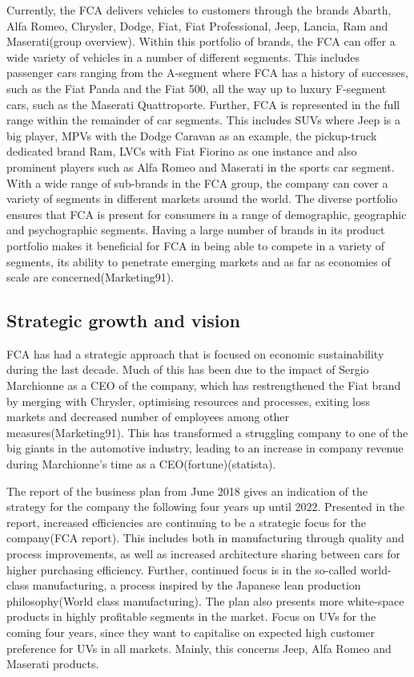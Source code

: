 Currently, the FCA delivers vehicles to customers through the brands Abarth, Alfa Romeo, Chrysler, Dodge, Fiat, Fiat Professional, Jeep, Lancia, Ram and Maserati(group overview). Within this portfolio of brands, the FCA can offer a wide variety of vehicles in a number of different segments. This includes passenger cars ranging from the A-segment where FCA has a history of successes, such as the Fiat Panda and the Fiat 500, all the way up to luxury F-segment cars, such as the Maserati Quattroporte. 
Further, FCA is represented in the full range within the remainder of car segments. This includes SUVs where Jeep is a big player, MPVs with the Dodge Caravan as an example, the pickup-truck dedicated brand Ram, LVCs with Fiat Fiorino as one instance and also prominent players such as Alfa Romeo and Maserati in the sports car segment. With a wide range of sub-brands in the FCA group, the company can cover a variety of segments in different markets around the world. The diverse portfolio ensures that FCA is present for consumers in a range of demographic, geographic and psychographic segments. Having a large number of brands in its product portfolio makes it beneficial for FCA in being able to compete in a variety of segments, its ability to penetrate emerging markets and as far as economies of scale are concerned(Marketing91).


\subsection{Strategic growth and vision}
FCA has had a strategic approach that is focused on economic sustainability during the last decade. Much of this has been due to the impact of Sergio Marchionne as a CEO of the company, which has restrengthened the Fiat brand by merging with Chrysler, optimising resources and processes, exiting loss markets and decreased number of employees among other measures(Marketing91). This has transformed a struggling company to one of the big giants in the automotive industry, leading to an increase in company revenue during Marchionne’s time as a CEO(fortune)(statista).

The report of the business plan from June 2018 gives an indication of the strategy for the company the following four years up until 2022. Presented in the report, increased efficiencies are continuing to be a strategic focus for the company(FCA report). This includes both in manufacturing through quality and process improvements, as well as increased architecture sharing between cars for higher purchasing efficiency. Further, continued focus is in the so-called world-class manufacturing, a process inspired by the Japanese lean production philosophy(World class manufacturing). The plan also presents more white-space products in highly profitable segments in the market. Focus on UVs for the coming four years, since they want to capitalise on expected high customer preference for UVs in all markets. Mainly, this concerns Jeep, Alfa Romeo and Maserati products. 

